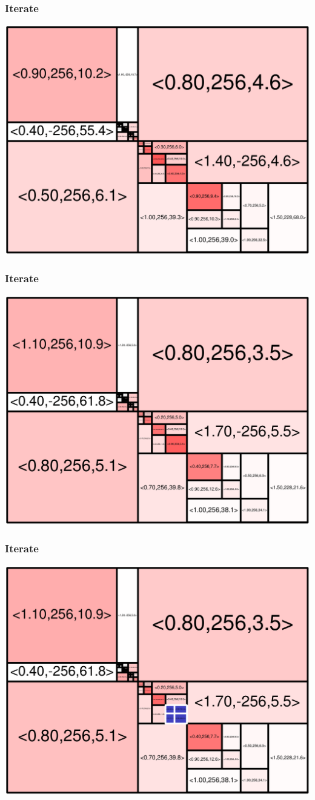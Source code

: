 \begin{frame}
\frametitle{Iterate}\begin{centering}\includegraphics[width=8.5 cm]{remy-graph/graph/test48.pdf}

\end{centering}\end{frame}


\begin{frame}
\frametitle{Iterate}\begin{centering}\includegraphics[width=8.5 cm]{remy-graph/graph/test49.pdf}

\end{centering}\end{frame}


\begin{frame}
\frametitle{Iterate}\begin{centering}\includegraphics[width=8.5 cm]{remy-graph/graph/test50.pdf}

\end{centering}\end{frame}


